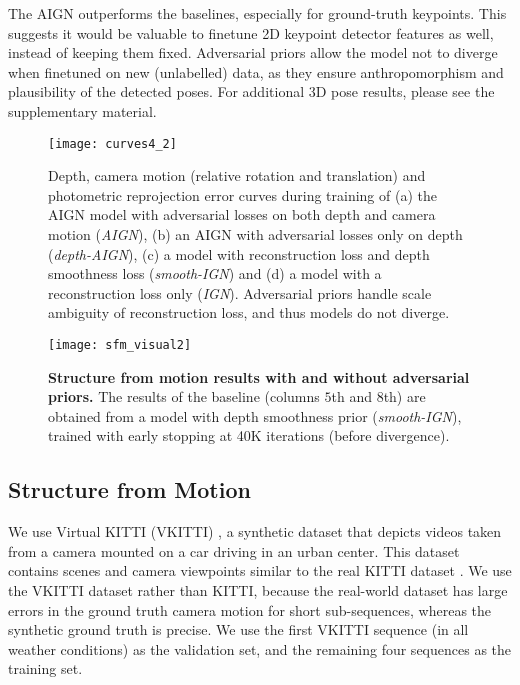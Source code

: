 \documentclass[10pt,twocolumn,letterpaper]{article}
\begin{document}
\begin{bibunit}[ieee]
The AIGN outperforms the baselines, especially for ground-truth keypoints. This suggests it would be valuable to finetune 2D keypoint detector features as well, instead of keeping them fixed. 
Adversarial priors allow the model not to diverge when finetuned on new (unlabelled) data, as they ensure anthropomorphism and plausibility of the detected poses.  For additional 3D pose results, please see the supplementary material.

\begin{figure}[h!]
    \centering
    \texttt{[image: curves4\_2]}
     \centering
    \caption{Depth, camera motion (relative rotation and translation) and  photometric reprojection error curves during training of (a) the AIGN model with adversarial losses on both depth and camera motion (\textit{AIGN}), (b) an AIGN with adversarial losses only on depth (\textit{depth-AIGN}), (c) a model with reconstruction loss and depth smoothness loss (\textit{smooth-IGN}) and (d) a model with a reconstruction loss only (\textit{IGN}). Adversarial priors handle scale ambiguity of reconstruction loss, and thus models do not diverge.}
    \label{fig:training-sfm-difficult}
\end{figure}\begin{figure*}[h!]
    \centering
    \texttt{[image: sfm\_visual2]}
     \centering
    \caption{\textbf{Structure from motion results with and without adversarial priors.} The results of the baseline (columns $5$th and $8$th) are obtained from a model with depth smoothness prior (\textit{smooth-IGN}), trained with early stopping at 40K iterations (before divergence).}
    \label{fig:sfm-visual}
\end{figure*}\subsection{Structure from Motion}
We use Virtual KITTI (VKITTI) \cite{Gaidon:Virtual:CVPR2016}, a synthetic dataset that depicts videos taken from a camera mounted on a car driving in an urban center. This dataset contains scenes and camera viewpoints similar to the real KITTI dataset \cite{Geiger2012CVPR}. We use the VKITTI dataset rather than KITTI, because the real-world dataset has large errors in the ground truth camera motion for short sub-sequences, whereas the synthetic ground truth is precise. %
We use the first VKITTI sequence (in all weather conditions) as the validation set, and the remaining four sequences as the training set.

\end{bibunit}
\end{document}
